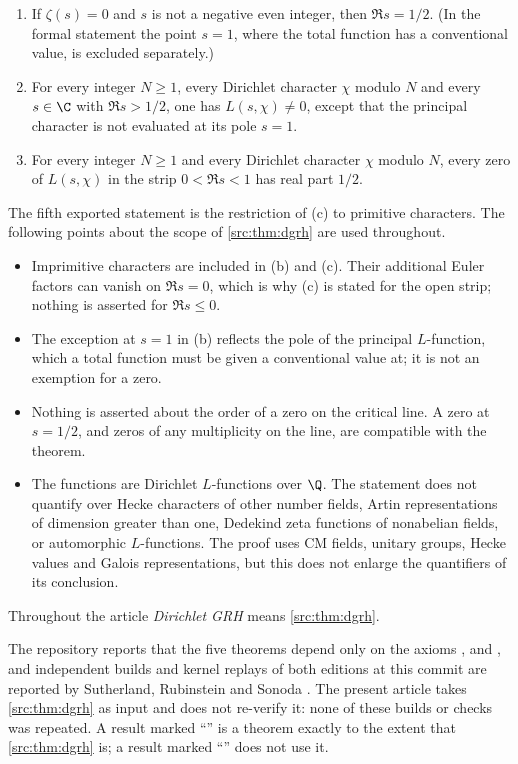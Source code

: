 \begin{theorem}\label{src:thm:dgrh}
\leavevmode
\begin{enumerate}[label=\textup{(\alph*)}]
\item If $\zeta(s)=0$ and $s$ is not a negative even integer, then $\Re s=1/2$. (In the
formal statement the point $s=1$, where the total function has a conventional value, is
excluded separately.)
\item For every integer $N\ge1$, every Dirichlet character $\chi$ modulo $N$ and every
$s\in\C$ with $\Re s>1/2$, one has $L(s,\chi)\ne0$, except that the principal character is
not evaluated at its pole $s=1$.
\item For every integer $N\ge1$ and every Dirichlet character $\chi$ modulo $N$, every zero
of $L(s,\chi)$ in the strip $0<\Re s<1$ has real part $1/2$.
\end{enumerate}
\end{theorem}

The fifth exported statement is the restriction of (c) to primitive characters. The following
points about the scope of \cref{src:thm:dgrh} are used throughout.
\begin{itemize}
\item Imprimitive characters are included in (b) and (c). Their additional Euler factors can
vanish on $\Re s=0$, which is why (c) is stated for the open strip; nothing is asserted for
$\Re s\le0$.
\item The exception at $s=1$ in (b) reflects the pole of the principal $L$-function, which a
total function must be given a conventional value at; it is not an exemption for a zero.
\item Nothing is asserted about the order of a zero on the critical line. A zero at $s=1/2$,
and zeros of any multiplicity on the line, are compatible with the theorem.
\item The functions are Dirichlet $L$-functions over $\Q$. The statement does not quantify
over Hecke characters of other number fields, Artin representations of dimension greater
than one, Dedekind zeta functions of nonabelian fields, or automorphic $L$-functions. The
proof uses CM fields, unitary groups, Hecke values and Galois representations, but this does
not enlarge the quantifiers of its conclusion.
\end{itemize}
Throughout the article \emph{Dirichlet GRH} means \cref{src:thm:dgrh}.

The repository reports that the five theorems depend only on the axioms ,
 and , and independent builds and kernel replays of
both editions at this commit are reported by Sutherland, Rubinstein and Sonoda
\cite{Sutherland2026Verification,Rubinstein2026Check,Sonoda2026Build}. The present article
takes \cref{src:thm:dgrh} as input and does not re-verify it: none of these builds or checks
was repeated. A result marked ``\stG'' is a theorem exactly to the extent that
\cref{src:thm:dgrh} is; a result marked ``\stU'' does not use it.

